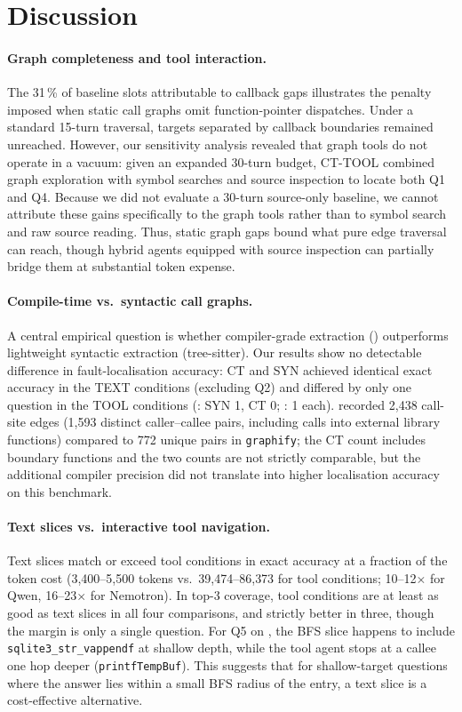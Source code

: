 \section{Discussion}
\label{sec:discussion}

\paragraph{Graph completeness and tool interaction.}
The 31\,\% of baseline slots attributable to callback gaps illustrates the penalty
imposed when static call graphs omit function-pointer dispatches.
Under a standard 15-turn traversal, targets separated by callback boundaries remained
unreached.
However, our sensitivity analysis revealed that graph tools do not operate in a vacuum:
given an expanded 30-turn budget, \textsc{CT-TOOL} combined graph exploration with symbol
searches and source inspection to locate both Q1 and Q4.
Because we did not evaluate a 30-turn source-only baseline, we cannot attribute these gains
specifically to the graph tools rather than to symbol search and raw source reading.
Thus, static graph gaps bound what pure edge traversal can reach,
though hybrid agents equipped with source inspection can partially bridge them at
substantial token expense.

\paragraph{Compile-time vs.\ syntactic call graphs.}
A central empirical question is whether compiler-grade extraction (\clang) outperforms
lightweight syntactic extraction (tree-sitter).
Our results show no detectable difference in fault-localisation accuracy: \textsc{CT} and
\textsc{SYN} achieved identical exact accuracy in the \textsc{TEXT} conditions (excluding Q2) and differed by
only one question in the \textsc{TOOL} conditions (\qwen: SYN 1, CT 0; \nemotron: 1 each).
\clang recorded 2{,}438 call-site edges (1{,}593 distinct caller--callee pairs, including calls
into external library functions) compared to 772 unique pairs in \texttt{graphify}; the CT count
includes boundary functions and the two counts are not strictly comparable, but the additional
compiler precision did not translate into higher localisation accuracy on this benchmark.

\paragraph{Text slices vs.\ interactive tool navigation.}
Text slices match or exceed tool conditions in exact accuracy at a fraction of
the token cost (3{,}400--5{,}500 tokens vs.\ 39{,}474--86{,}373 for tool conditions;
10--12$\times$ for Qwen, 16--23$\times$ for Nemotron).
In top-3 coverage, tool conditions are at least as good as text slices in all four
comparisons, and strictly better in three, though the margin is only a single question.
For Q5 on \qwen, the BFS slice happens to include
\texttt{sqlite3\_str\_vappendf} at shallow depth, while the tool agent
stops at a callee one hop deeper (\texttt{printfTempBuf}).
This suggests that for shallow-target questions where the answer lies within a
small BFS radius of the entry, a text slice is a cost-effective alternative.

